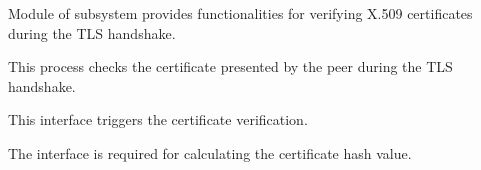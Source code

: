 



Module  of  subsystem 
 provides functionalities for verifying X.509 certificates during the TLS handshake.



This process checks the certificate presented by the peer during the TLS
handshake.





This interface triggers the certificate verification.


The interface  is required for
calculating the certificate hash value.





